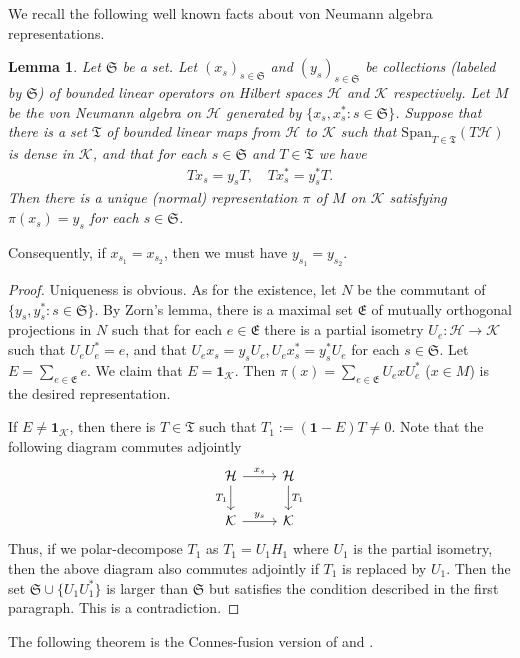 \documentclass[11pt,b5paper,notitlepage]{article}
\theoremstyle{definition}
\theoremstyle{plain}
\newtheorem{lm}[df]{Lemma}
\newcommand{\fk}{\mathfrak}
\newcommand{\mc}{\mathcal}
\newcommand{\id}{\mathbf{1}}
\newcommand{\Span}{\mathrm{Span}}
\numberwithin{equation}{section}
\begin{document}
We recall the following well known facts about von Neumann algebra representations.
\begin{lm}\label{lb3}
Let $\fk S$ be a set. Let $(x_s)_{s\in\fk S}$ and $(y_s)_{s\in\fk S}$ be collections (labeled by $\fk S$) of bounded linear operators on Hilbert spaces $\mc H$ and $\mc K$ respectively. Let $M$ be the von Neumann algebra on $\mc H$ generated by $\{x_s,x_s^*:s\in \fk S\}$. Suppose that there is a set $\fk T$ of bounded  linear maps from $\mc H$ to $\mc K$ such that $\Span_{T\in\fk T}(T\mc H)$ is dense in $\mc K$, and that for each $s\in \fk S$ and $T\in\fk T$ we have
	\begin{align*}
		Tx_s=y_sT,\quad Tx_s^*=y_s^*T.	
	\end{align*}
	Then there is a unique  (normal) representation $\pi$ of $M$ on $\mc K$ satisfying $\pi(x_s)=y_s$ for each $s\in\fk S$.
\end{lm}

Consequently, if $x_{s_1}=x_{s_2}$, then we must have $y_{s_1}=y_{s_2}$.

\begin{proof}
	Uniqueness is obvious. As for the existence, let $N$ be the  commutant of $\{y_s,y_s^*:s\in\fk S\}$. By Zorn's lemma, there is a maximal set $\fk E$ of mutually orthogonal projections in $N$ such that for each $e\in\fk E$ there is a partial isometry $U_e:\mc H\rightarrow\mc K$ such that $U_eU_e^*=e$, and that $U_ex_s=y_sU_e,U_ex_s^*=y_s^*U_e$ for each $s\in\fk S$.  Let $E=\sum_{e\in\fk E}e$. We claim that $E=\id_{\mc K}$. Then $\pi(x)=\sum_{e\in\fk E}U_exU_e^*$ ($x\in M$) is the desired representation. 
	
	If $E\neq \id_{\mc K}$, then there is $T\in\fk T$ such that $T_1:=(\id-E)T\neq 0$. Note that the following diagram commutes adjointly
	\begin{equation*}
		\begin{tikzcd}
			\mc H\arrow[r,"x_s"]\arrow[d,"T_1"']&\mc H\arrow[d,"T_1"]\\
			\mc K\arrow[r,"y_s"]&\mc K
		\end{tikzcd}	
	\end{equation*}
	Thus, if we polar-decompose $T_1$ as $T_1=U_1H_1$ where $U_1$ is the  partial isometry, then the above diagram also commutes adjointly if $T_1$ is replaced by $U_1$. Then the set $\fk S\cup\{U_1U_1^*\}$ is larger than $\fk S$ but satisfies the condition described in the first paragraph. This is a contradiction.
\end{proof}

The following theorem is the Connes-fusion version of \cite[Lem. 3.1]{EP03} and \cite[Prop. 3.24]{BKLR15}.
\end{document}

